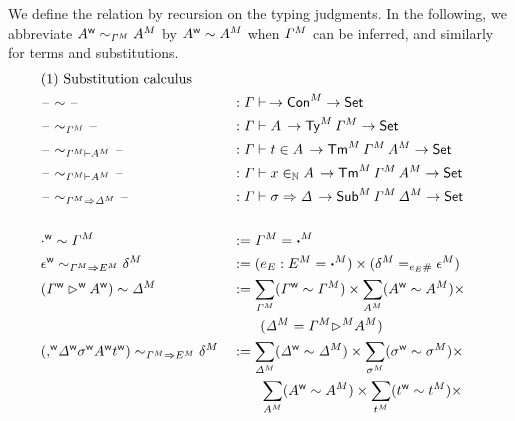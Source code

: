 \begin{definition}
We define the relation by recursion on the typing judgments.
In the following, we abbreviate ${A}^{\mathsf{w}} \sim_{{\mathit{\Gamma}}^M} {A}^M$ by
${A}^{\mathsf{w}}\sim{A}^M$ when ${\mathit{\Gamma}}^M$ can be inferred, and similarly for
terms and substitutions.
\begin{alignat*}{5}
  & \rlap{(1) Substitution calculus} \\
  & \blank \sim{ \blank} && :  \GG \vdash \, \ra \model{\Con} \ra \Set \\
  & \relT{\blank}{\model{\GG}}{\blank} && :  \GG \vdash A \, \ra \model{\Ty}\,\model{\GG} \ra \Set \\
  & \relt{\blank}{\model{\GG}}{\model{A}}{\blank} && :  \GG \vdash t \in A \, \ra \model{\Tm}\,\model{\GG}\,\model{A} \ra \Set \\
  & \relV{\blank}{\model{\GG}}{\model{A}}{\blank}&& :  \GG \vdash x \invar A \, \ra \model{\Tm}\,\model{\GG}\,\model{A} \ra \Set \\
  & \relS{\blank}{\model{\GG}}{\model{\GD}}{ \blank} && :  \GG \vdash \sigma \Rightarrow \GD \, \ra \model{\Sub}\,\model{\GG}\,\model{\GD} \ra \Set \\
  \\
  & \emptyw\sim \model{\GG} && := \model{\GG}=\model{\boldsymbol{\cdot}} \\
  & \relS{\epsilonw}{\model{\GG}}{\model{E}}{\model{\delta}}
  &&
 := (e_E : \model{E} = \model{\boldsymbol{\cdot}})\times (\model{\delta} = _{e_E \#}
 \model{\epsilon})
  \\
  & (\wf{\GG}\extw \wf{A})\sim \model{\GD} &&
   :=
    \sum_{\model{\GG}} (\wf{\GG}\sim\model{\GG}) \times
    \sum_{\model{A}} (\wf{A}\sim\model{A}) \times
    \\
    & && \qquad
    (\model{\GD} = \model{\GG} \model{\ext} \model{A})
    \\
    &
    \relS{(\consw\wf{\GD}\wf{\sigma}\wf{A}\wf{t})}{\model{\GG}}{\model{E}}{\model{\delta}}
    &&
   :=
    \sum_{\model{\GD}} (\wf{\GD}\sim\model{\GD}) \times
    \sum_{\model{\sigma}} (\wf{\sigma}\sim\model{\sigma}) \times
    \\
    & && \qquad
    \sum_{\model{A}} (\wf{A}\sim\model{A}) \times
    \sum_{\model{t}} (\wf{t}\sim\model{t}) \times
    \\

\end{alignat*}
\end{definition}

